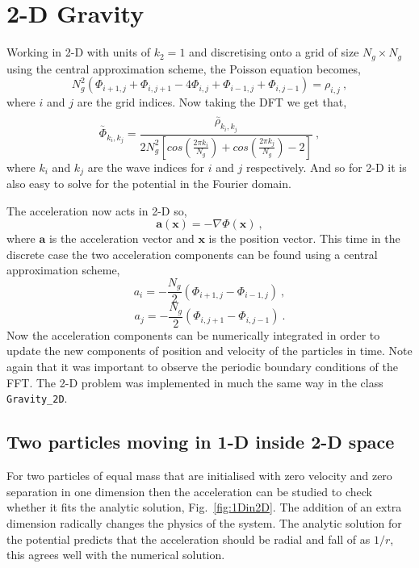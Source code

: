 \documentclass[10pt,a4paper]{article}
\begin{document}
\section{2-D Gravity}
Working in 2-D with units of $k_2=1$ and discretising onto a grid of size $N_g\times  N_g$ using the central approximation scheme, the Poisson equation becomes,
\begin{equation}
N_g^2\left(\Phi_{i+1,j}+\Phi_{i,j+1}-4\Phi_{i,j}+\Phi_{i-1,j}+\Phi_{i,j-1} \right) = \rho_{i,j} \:,
\end{equation}
where $i$ and $j$ are the grid indices. Now taking the DFT we get that,
\begin{equation}
\stackrel{{}_{\sim}\phantom{000|0}}{\Phi_{k_i,k_j}} = \frac{\stackrel{{}_{\sim}\phantom{0000}}{\rho_{k_i,k_j}}}{2N_g^2\left[cos\left(\frac{2\pi k_i}{N_g}\right)+cos\left(\frac{2\pi k_j}{N_g}\right)-2\right]}\:,
\end{equation}
where $k_i$ and $k_j$ are the wave indices for $i$ and $j$ respectively. And so for 2-D it is also easy to solve for the potential in the Fourier domain.

The acceleration now acts in 2-D so,
\begin{equation}
\textbf{a}(\textbf{x}) = -\nabla \Phi(\textbf{x})\:,
\end{equation}
where $\textbf{a}$ is the acceleration vector and $\textbf{x}$ is the position vector. This time in the discrete case  the two acceleration components can be found using a central approximation scheme,
\begin{equation}
a_i = -\frac{N_g}{2}\left(\Phi_{i+1,j}-\Phi_{i-1,j}\right) \:,
\end{equation}
\begin{equation}
a_j = -\frac{N_g}{2}\left(\Phi_{i,j+1}-\Phi_{i,j-1}\right) \:.
\end{equation}
Now the acceleration components can be numerically integrated in order to update the new components of position and velocity of the particles in time. Note again that it was important to observe the periodic boundary conditions of the FFT. The 2-D problem was implemented in much the same way in the class \texttt{Gravity\_2D}.
\newpage
\subsection{Two particles moving in 1-D inside 2-D space}
For two particles of equal mass that are initialised with zero velocity and zero separation in one dimension then the acceleration can be studied to check whether it fits the analytic solution, Fig.~\ref{fig:1Din2D}. The addition of an extra dimension radically changes the physics of the system. The analytic solution for the potential predicts that the acceleration should be radial and fall of as $1/r$, this agrees well with the numerical solution.
\end{document}
